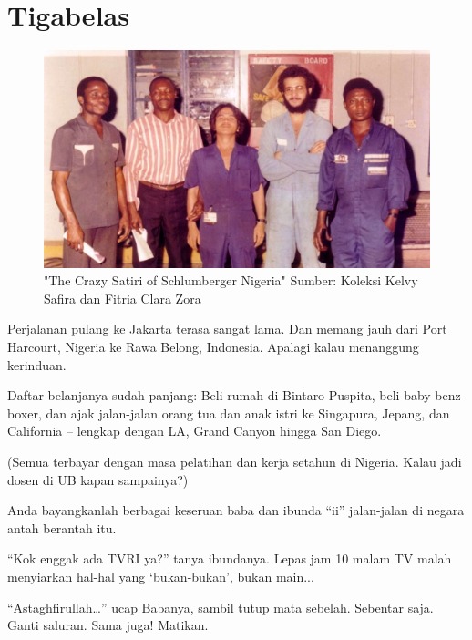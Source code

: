 
\chapter{Tigabelas}

\begin{figure}[htbp]
\centerline{\includegraphics[scale=1.0]{01-13-01}}
\caption{"The Crazy Satiri of Schlumberger Nigeria" Sumber: Koleksi Kelvy Safira dan Fitria Clara Zora}
\label{01-13-01}
\end{figure}
%
Perjalanan pulang ke Jakarta terasa sangat lama. Dan memang jauh dari Port Harcourt, Nigeria ke Rawa Belong, Indonesia. Apalagi kalau menanggung kerinduan.

Daftar belanjanya sudah panjang: Beli rumah di Bintaro Puspita, beli baby benz boxer, dan ajak jalan-jalan orang tua dan anak istri ke Singapura, Jepang, dan California – lengkap dengan LA, Grand Canyon hingga San Diego.

(Semua terbayar dengan masa pelatihan dan kerja setahun di Nigeria. Kalau jadi dosen di UB kapan sampainya?)

Anda bayangkanlah berbagai keseruan baba dan ibunda “ii” jalan-jalan di negara antah berantah itu.

“Kok enggak ada TVRI ya?” tanya ibundanya. Lepas jam 10 malam TV malah menyiarkan hal-hal yang ‘bukan-bukan’, bukan main...

“Astaghfirullah…” ucap Babanya, sambil tutup mata sebelah. Sebentar saja. Ganti saluran. Sama juga! Matikan.

